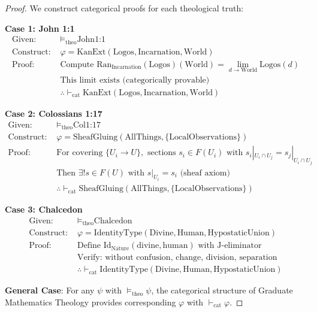 \documentclass{article}
\begin{document}
\begin{proof}
We construct categorical proofs for each theological truth:

\textbf{Case 1: John 1:1}
\begin{align*}
\text{Given: } &\models_{\text{theo}} \text{John1:1} \\
\text{Construct: } &\varphi = \text{KanExt}(\text{Logos}, \text{Incarnation}, \text{World}) \\
\text{Proof: } &\text{Compute } \mathrm{Ran}_{\text{Incarnation}}(\text{Logos})(\text{World}) = \lim_{d \to \text{World}} \text{Logos}(d) \\
&\text{This limit exists (categorically provable)} \\
&\therefore \vdash_{\text{cat}} \text{KanExt}(\text{Logos}, \text{Incarnation}, \text{World})
\end{align*}

\textbf{Case 2: Colossians 1:17}
\begin{align*}
\text{Given: } &\models_{\text{theo}} \text{Col1:17} \\
\text{Construct: } &\varphi = \text{SheafGluing}(\text{AllThings}, \{\text{LocalObservations}\}) \\
\text{Proof: } &\text{For covering } \{U_i \to U\}, \text{ sections } s_i \in F(U_i) \text{ with } s_i|_{U_i \cap U_j} = s_j|_{U_i \cap U_j} \\
&\text{Then } \exists! s \in F(U) \text{ with } s|_{U_i} = s_i \text{ (sheaf axiom)} \\
&\therefore \vdash_{\text{cat}} \text{SheafGluing}(\text{AllThings}, \{\text{LocalObservations}\})
\end{align*}

\textbf{Case 3: Chalcedon}
\begin{align*}
\text{Given: } &\models_{\text{theo}} \text{Chalcedon} \\
\text{Construct: } &\varphi = \text{IdentityType}(\text{Divine}, \text{Human}, \text{HypostaticUnion}) \\
\text{Proof: } &\text{Define } \mathrm{Id}_{\text{Nature}}(\text{divine}, \text{human}) \text{ with J-eliminator} \\
&\text{Verify: without confusion, change, division, separation} \\
&\therefore \vdash_{\text{cat}} \text{IdentityType}(\text{Divine}, \text{Human}, \text{HypostaticUnion})
\end{align*}

\textbf{General Case}: For any $\psi$ with $\models_{\text{theo}} \psi$, the categorical structure of Graduate Mathematics Theology provides corresponding $\varphi$ with $\vdash_{\text{cat}} \varphi$.
\end{proof}
\end{document}
